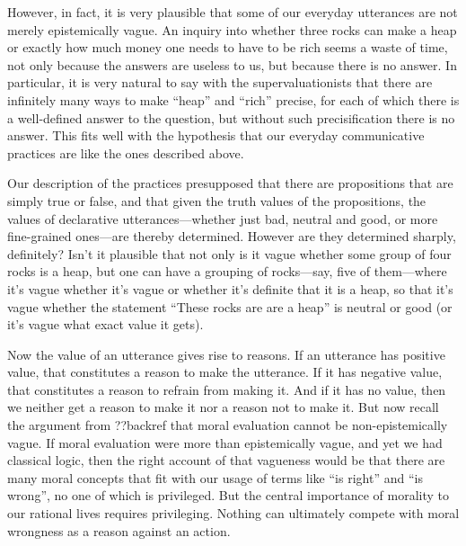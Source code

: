 However, in fact, it is very plausible that some of our everyday utterances are not merely epistemically vague. An inquiry into whether three rocks can make 
a heap or exactly how much money one needs to have to be rich seems a waste of time, not only because the answers are useless to us, 
but because there is no answer. In particular, it is very natural to say with the supervaluationists that there are infinitely many 
ways to make ``heap'' and ``rich'' precise, for each of which there is a well-defined answer to the question, but without such
precisification there is no answer. This fits well with the hypothesis that our everyday communicative practices are  
like the ones described above. 

Our description of the practices presupposed that there are propositions that are simply true or false, and that given the truth
values of the propositions, the values of declarative utterances---whether just bad, neutral and good, or more fine-grained ones---are thereby
determined. However are they determined sharply, definitely? Isn't it plausible that not only is it vague whether some group of four rocks is a heap, 
but one can have a grouping of rocks---say, five of them---where it's vague whether it's vague or whether it's definite that it is a heap, so that 
it's vague whether the statement ``These rocks are are a heap'' is neutral or good (or it's vague what exact value it gets).

Now the value of an utterance gives rise to reasons. If an utterance has positive value, that constitutes a reason to make the utterance.
If it has negative value, that constitutes a reason to refrain from making it. And if it has no value, then we neither get a reason to make
it nor a reason not to make it. But now recall the argument from ??backref that moral evaluation 
cannot be non-epistemically vague. If moral evaluation were more than epistemically vague, and yet we had classical logic, then the right account 
of that vagueness would be that there
are many moral concepts that fit with our usage of terms like ``is right'' and ``is wrong'', no one of which is privileged. But the 
central importance of morality to our rational lives requires privileging. Nothing can ultimately compete with moral wrongness as a reason
against an action. 

